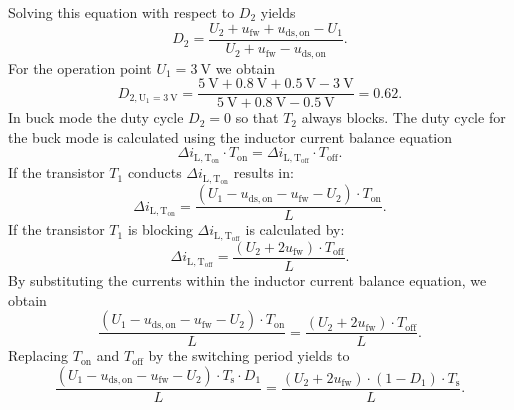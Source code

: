 \begin{solutionblock}
\begin{equation*}
    \end{equation*}
    Solving this equation with respect to $D_\mathrm{2}$ yields
    \begin{equation*}
        D_\mathrm{2} = \frac{U_\mathrm{2}+ u_\mathrm{fw} + u_\mathrm{ds,on}-U_\mathrm{1}}{U_\mathrm{2}+ u_\mathrm{fw} - u_\mathrm{ds,on}}.
    \end{equation*}
    For the operation point $U_\mathrm{1}=\SI{3}{\volt}$ we obtain
    \begin{equation*}
        D_\mathrm{2,U_\mathrm{1}=\SI{3}{\volt}}=\frac{\SI{5}{\volt}+ \SI{0.8}{\volt} + \SI{0.5}{\volt}-\SI{3}{\volt}}{\SI{5}{\volt} + \SI{0.8}{\volt} - \SI{0.5}{\volt}}
        = 0.62.
    \end{equation*}
    In buck mode the duty cycle $D_\mathrm{2}=0$ so that $T_\mathrm{2}$ always blocks.
    The duty cycle for the buck mode is calculated using the inductor current balance equation
    \begin{equation*}
        \Delta i_\mathrm{L,T_\mathrm{on}} \cdot T_\mathrm{on}=\Delta i_\mathrm{L,T_\mathrm{off}} \cdot T_\mathrm{off}.
    \end{equation*}
    If the transistor $T_\mathrm{1}$ conducts $\Delta i_\mathrm{L,T_\mathrm{on}}$ results in:
    \begin{equation*}
        \Delta i_\mathrm{L,T_\mathrm{on}}=\frac{(U_\mathrm{1}-u_\mathrm{ds,on} - u_\mathrm{fw} - U_\mathrm{2}) \cdot T_\mathrm{on} }{L}.
    \end{equation*}
    If the transistor $T_\mathrm{1}$ is blocking $\Delta i_\mathrm{L,T_\mathrm{off}}$ is calculated by:
    \begin{equation*}
        \Delta i_\mathrm{L,T_\mathrm{off}}=\frac{(U_\mathrm{2} + 2 u_\mathrm{fw}) \cdot T_\mathrm{off}}{L}.
    \end{equation*}
    By substituting the currents within the inductor current balance equation, we obtain
    \begin{equation*}
        \frac{(U_\mathrm{1}-u_\mathrm{ds,on} - u_\mathrm{fw} - U_\mathrm{2}) \cdot T_\mathrm{on} }{L}=\frac{(U_\mathrm{2} + 2 u_\mathrm{fw}) \cdot T_\mathrm{off}}{L}.
    \end{equation*}
    Replacing $T_\mathrm{on}$ and $T_\mathrm{off}$ by the switching period yields to
    \begin{equation*}
        \frac{(U_\mathrm{1}-u_\mathrm{ds,on} - u_\mathrm{fw} - U_\mathrm{2}) \cdot T_\mathrm{s} \cdot D_\mathrm{1}}{L} =
        \frac{(U_\mathrm{2} + 2 u_\mathrm{fw}) \cdot (1-D_\mathrm{1}) \cdot T_\mathrm{s}}{L}.

\end{equation*}
\end{solutionblock}
